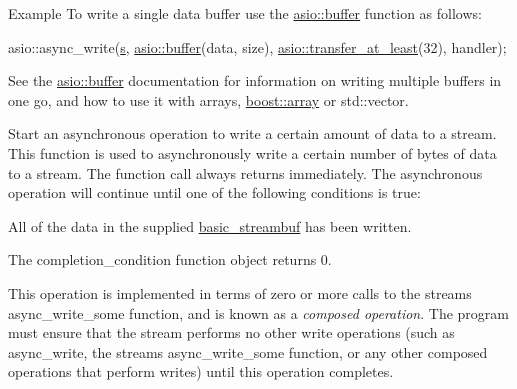 \begin{DoxyParagraph}{Example}
To write a single data buffer use the \hyperlink{group__buffer}{asio\+::buffer} function as follows\+: 
\begin{DoxyCode}
asio::async\_write(\hyperlink{group__async__connect_ga31ab74b9ea6c77932dddd016cfc7920a}{s},
   \hyperlink{group__buffer_ga1ed66e401559cbfd19595392f653b47c}{asio::buffer}(data, size),
   \hyperlink{group__completion__condition_ga2b10af704afcd6c7ed7f0d3b740033ef}{asio::transfer\_at\_least}(32),
   handler); 
\end{DoxyCode}
 See the \hyperlink{group__buffer}{asio\+::buffer} documentation for information on writing multiple buffers in one go, and how to use it with arrays, \hyperlink{classboost_1_1array}{boost\+::array} or std\+::vector.
\end{DoxyParagraph}
Start an asynchronous operation to write a certain amount of data to a stream. This function is used to asynchronously write a certain number of bytes of data to a stream. The function call always returns immediately. The asynchronous operation will continue until one of the following conditions is true\+:

\begin{DoxyItemize}
\item All of the data in the supplied \hyperlink{classasio_1_1basic__streambuf}{basic\+\_\+streambuf} has been written.\end{DoxyItemize}
\begin{DoxyItemize}
\item The completion\+\_\+condition function object returns 0.\end{DoxyItemize}
This operation is implemented in terms of zero or more calls to the stream\textquotesingle{}s async\+\_\+write\+\_\+some function, and is known as a {\itshape composed operation}. The program must ensure that the stream performs no other write operations (such as async\+\_\+write, the stream\textquotesingle{}s async\+\_\+write\+\_\+some function, or any other composed operations that perform writes) until this operation completes.


